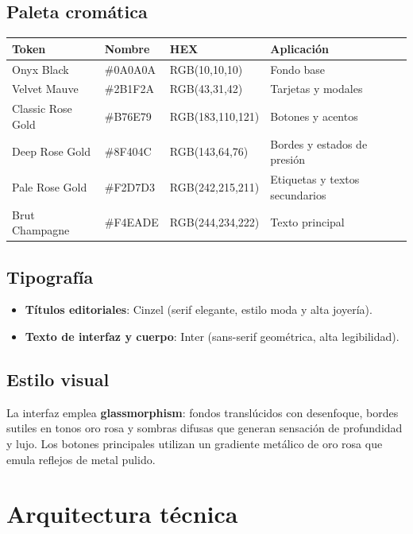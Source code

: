 \documentclass[11pt,a4paper]{article}
\begin{document}
\subsection{Paleta cromática}

\begin{center}
\begin{tabular}{llll}
\toprule
\textbf{Token} & \textbf{Nombre} & \textbf{HEX} & \textbf{Aplicación} \\
\midrule
Onyx Black & \#0A0A0A & RGB(10,10,10) & Fondo base \\
Velvet Mauve & \#2B1F2A & RGB(43,31,42) & Tarjetas y modales \\
Classic Rose Gold & \#B76E79 & RGB(183,110,121) & Botones y acentos \\
Deep Rose Gold & \#8F404C & RGB(143,64,76) & Bordes y estados de presión \\
Pale Rose Gold & \#F2D7D3 & RGB(242,215,211) & Etiquetas y textos secundarios \\
Brut Champagne & \#F4EADE & RGB(244,234,222) & Texto principal \\
\bottomrule
\end{tabular}
\end{center}

\subsection{Tipografía}

\begin{itemize}[leftmargin=*]
  \item \textbf{Títulos editoriales}: Cinzel (serif elegante, estilo moda y alta joyería).
  \item \textbf{Texto de interfaz y cuerpo}: Inter (sans-serif geométrica, alta legibilidad).
\end{itemize}

\subsection{Estilo visual}

La interfaz emplea \textbf{glassmorphism}: fondos translúcidos con desenfoque, bordes sutiles en tonos oro rosa y sombras difusas que generan sensación de profundidad y lujo. Los botones principales utilizan un gradiente metálico de oro rosa que emula reflejos de metal pulido.

\section{Arquitectura técnica}
\end{document}
